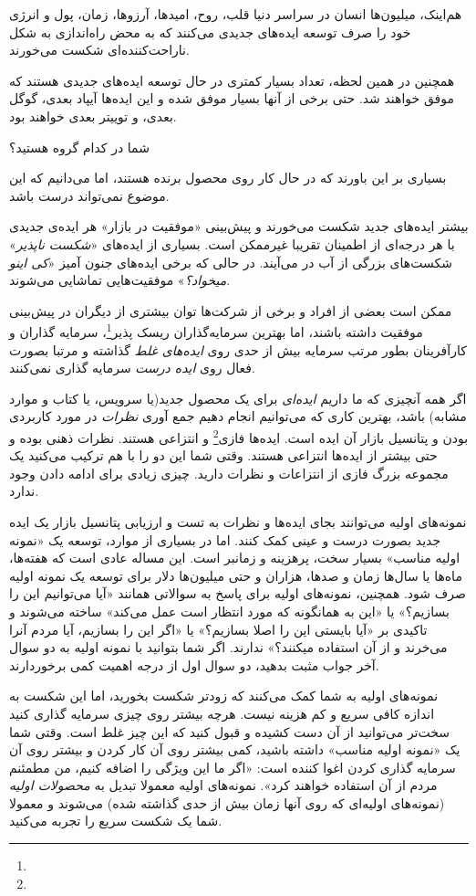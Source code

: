 هم‌اینک، میلیون‌ها انسان در سراسر دنیا قلب، روح، امیدها، آرزوها، زمان،
پول و انرژی خود را صرف توسعه ایده‌های جدیدی می‌کنند که به محض راه‌اندازی
به شکل ناراحت‌کننده‌ای شکست می‌خورند.

همچنین در همین لحظه، تعداد بسیار کمتری در حال توسعه ایده‌های جدیدی هستند
که موفق خواهند شد. حتی برخی از آنها بسیار موفق شده و این ایده‌ها آیپاد
بعدی، گوگل بعدی، و توییتر بعدی خواهند بود.

شما در کدام گروه هستید؟

بسیاری بر این باورند که در حال کار روی محصول برنده هستند، اما می‌دانیم
که این موضوع نمی‌تواند درست باشد.

بیشتر ایده‌های جدید شکست می‌خورند و پیش‌بینی «موفقیت در بازار» هر ایده‌ی
جدیدی با هر درجه‌ای از اطمینان تقریبا غیرممکن است. بسیاری از ایده‌های
«\emph{شکست ناپذیر}» شکست‌های بزرگی از آب در می‌آیند. در حالی که برخی
ایده‌های جنون آمیز «\emph{کی اینو میخواد؟}» موفقیت‌هایی تماشایی می‌شوند.

ممکن است بعضی از افراد و برخی از شرکت‌ها توان بیشتری از دیگران در
پیش‌بینی موفقیت داشته باشند، اما بهترین سرمایه‌گذاران ریسک
پذیر\footnote{ }، سرمایه گذاران و کارآفرینان
بطور مرتب سرمایه بیش از حدی روی \emph{ایده‌های غلط} گذاشته و مرتبا بصورت
فعال روی \emph{ایده درست} سرمایه گذاری نمی‌کنند.

اگر همه آنچیزی که ما داریم \emph{ایده‌ای} برای یک محصول جدید(یا سرویس،
یا کتاب و موارد مشابه) باشد، بهترین کاری که می‌توانیم انجام دهیم جمع
آوری \emph{نظرات} در مورد کاربردی بودن و پتانسیل بازار آن ایده است.
ایده‌ها فازی\footnote{} و انتزاعی هستند. نظرات ذهنی بوده و حتی
بیشتر از ایده‌ها انتزاعی هستند. وقتی شما این دو را با هم ترکیب می‌کنید
یک مجموعه بزرگ فازی از انتزاعات و نظرات دارید. چیزی زیادی برای ادامه
دادن وجود ندارد.

نمونه‌های اولیه می‌توانند بجای ایده‌ها و نظرات به تست و ارزیابی پتانسیل
بازار یک ایده جدید بصورت درست و عینی کمک کنند. اما در بسیاری از موارد،
توسعه یک «نمونه اولیه مناسب» بسیار سخت، پرهزینه و زمانبر است. این مساله
عادی است که هفته‌ها، ماه‌ها یا سال‌ها زمان و صدها، هزاران و حتی
میلیون‌ها دلار برای توسعه یک نمونه اولیه صرف شود. همچنین، نمونه‌های
اولیه برای پاسخ به سوالاتی همانند «آیا می‌توانیم این را بسازیم؟» یا «این
به همانگونه که مورد انتظار است عمل می‌کند» ساخته می‌شوند و تاکیدی بر
«آیا بایستی این را اصلا بسازیم؟» یا «اگر این را بسازیم، آیا مردم آنرا
می‌خرند و از آن استفاده میکنند؟» ندارند. اگر شما بتوانید با نمونه اولیه
به دو سوال آخر جواب مثبت بدهید، دو سوال اول از درجه اهمیت کمی
برخوردارند.

نمونه‌های اولیه به شما کمک می‌کنند که زودتر شکست بخورید، اما این شکست به
اندازه کافی سریع و کم هزینه نیست. هرچه بیشتر روی چیزی سرمایه گذاری کنید
سخت‌تر می‌توانید از آن دست کشیده و قبول کنید که این چیز غلط است. وقتی
شما یک «نمونه اولیه مناسب» داشته باشید، کمی بیشتر روی آن کار کردن و
بیشتر روی آن سرمایه گذاری کردن اغوا کننده است: «اگر ما این ویژگی را
اضافه کنیم، من مطمئنم مردم از آن استفاده خواهند کرد». نمونه‌های اولیه
معمولا تبدیل به \emph{محصولات اولیه} (نمونه‌های اولیه‌ای که روی آنها
زمان بیش از حدی گذاشته شده) می‌شوند و معمولا شما یک شکست سریع را تجربه
می‌کنید.


